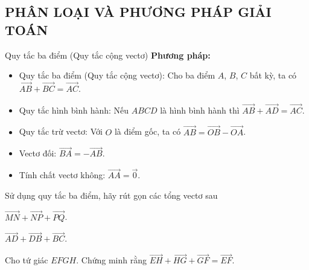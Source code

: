 \subsection{PHÂN LOẠI VÀ PHƯƠNG PHÁP GIẢI TOÁN}
\begin{dang}{Quy tắc ba điểm (Quy tắc cộng vectơ)}
	\textbf{Phương pháp:}
	\begin{itemize}
		\item	Quy tắc ba điểm (Quy tắc cộng vectơ): Cho ba điểm $A$, $B$, $C$ bất kỳ, ta có $\overrightarrow{AB} + \overrightarrow{BC} = \overrightarrow{AC}$.
		\item  Quy tắc hình bình hành: Nếu $ABCD$ là hình bình hành thì $\overrightarrow{AB} + \overrightarrow{AD} = \overrightarrow{AC}$.
		\item Quy tắc trừ vectơ: Với $O$ là điểm gốc, ta có $\overrightarrow{AB} = \overrightarrow{OB} - \overrightarrow{OA}$.
		\item  Vectơ đối: $\overrightarrow{BA} = -\overrightarrow{AB}$.
		\item  Tính chất vectơ không: $\overrightarrow{AA} = \overrightarrow{0}$.
	\end{itemize}
\end{dang}
\begin{vd}%
	Sử dụng quy tắc ba điểm, hãy rút gọn các tổng vectơ sau
	\begin{listEX}[1]
		\item $\overrightarrow{MN} + \overrightarrow{NP} + \overrightarrow{PQ}$.\dotfill
		\item  $\overrightarrow{AD} + \overrightarrow{DB} + \overrightarrow{BC}$.\dotfill
	\end{listEX}
\end{vd}
\begin{vd}%
	Cho tứ giác $EFGH$. Chứng minh rằng $\overrightarrow{EH} + \overrightarrow{HG} + \overrightarrow{GF} = \overrightarrow{EF}$.
\end{vd}
